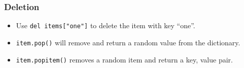 \subsubsection{Deletion}\label{ssub:deletion}

\begin{itemize}
    \item Use \texttt{del items["one"]} to delete the item with key ``one''.
    \item \texttt{item.pop()} will remove and return a random value from the dictionary.
    \item \texttt{item.popitem()} removes a random item and return a key, value pair.
\end{itemize}

